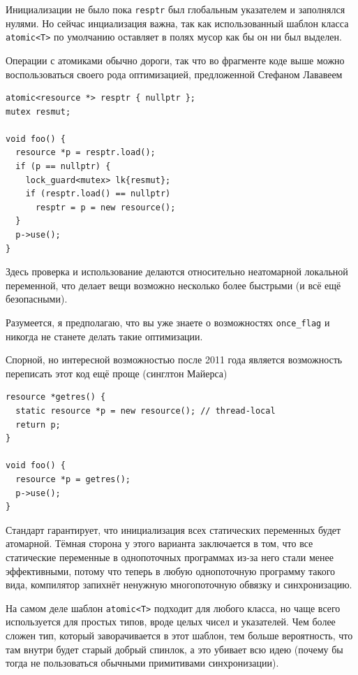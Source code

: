 \documentclass[a4paper,12pt,oneside]{book}
\begin{document}
Инициализации не было пока \lstinline!resptr! был глобальным указателем и заполнялся нулями. Но сейчас инциализация важна, так как использованный шаблон класса \lstinline!atomic<T>! по умолчанию оставляет в полях мусор как бы он ни был выделен.

Операции с атомиками обычно дороги, так что во фрагменте коде выше можно воспользоваться своего рода оптимизацией, предложенной Стефаном Лававеем

\begin{lstlisting}
atomic<resource *> resptr { nullptr };
mutex resmut;

void foo() {
  resource *p = resptr.load();
  if (p == nullptr) {
    lock_guard<mutex> lk{resmut};
    if (resptr.load() == nullptr)
      resptr = p = new resource();
  }
  p->use();
}
\end{lstlisting}

Здесь проверка и использование делаются относительно неатомарной локальной переменной, что делает вещи возможно несколько более быстрыми (и всё ещё безопасными).

Разумеется, я предполагаю, что вы уже знаете о возможностях \lstinline!once_flag! и никогда не станете делать такие оптимизации.

Спорной, но интересной возможностью после 2011 года является возможность переписать этот код ещё проще (синглтон Майерса)

\begin{lstlisting}
resource *getres() {
  static resource *p = new resource(); // thread-local
  return p;
}

void foo() {
  resource *p = getres();
  p->use();
}
\end{lstlisting}

Стандарт гарантирует, что инициализация всех статических переменных будет атомарной. Тёмная сторона у этого варианта заключается в том, что все статические переменные в однопоточных программах из-за него стали менее эффективными, потому что теперь в любую однопоточную программу такого вида, компилятор запихнёт ненужную многопоточную обвязку и синхронизацию.

На самом деле шаблон \lstinline!atomic<T>! подходит для любого класса, но чаще всего используется для простых типов, вроде целых чисел и указателей. Чем более сложен тип, который заворачивается в этот шаблон, тем больше вероятность, что там внутри будет старый добрый спинлок, а это убивает всю идею (почему бы тогда не пользоваться обычными примитивами синхронизации).
\end{document}
